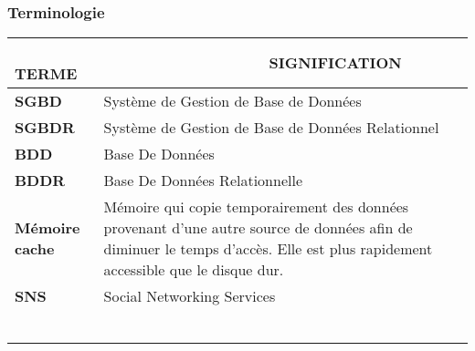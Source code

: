\newpage

\def\termea{\bf \footnotesize SGBD}
\def\sensa{\footnotesize Système de Gestion de Base de Données}

\def\termeb{\bf \footnotesize SGBDR}
\def\sensb{\footnotesize Système de Gestion de Base de Données Relationnel}

\def\terme{\bf \footnotesize BDD}
\def\sens{\footnotesize Base De Données}

\def\termec{\bf \footnotesize BDDR}
\def\sensc{\footnotesize Base De Données Relationnelle}

\def\termed{\bf \footnotesize Mémoire cache}
\def\sensd{\footnotesize Mémoire qui copie temporairement des données provenant d'une autre source de données afin de diminuer le temps d'accès. Elle est plus rapidement accessible que le disque dur.}

\def\termee{\bf \footnotesize SNS}
\def\sense{\footnotesize Social Networking Services}

\def\termef{\bf \footnotesize }
\def\sensf{\footnotesize }

\def\termeg{\bf \footnotesize }
\def\sensg{\footnotesize }

\def\termeh{\bf \footnotesize }
\def\sensh{\footnotesize }

\def\termei{\bf \footnotesize }
\def\sensi{\footnotesize }

\def\termej{\bf \footnotesize }
\def\sensj{\footnotesize }

\def\termek{\bf \footnotesize }
\def\sensk{\footnotesize }

~
\vfill
\begin{center}
\subsubsection*{Terminologie}
\begin{tabular}{p{5cm}p{12cm}}
\hline
{\bf ~~~~~ T{\scriptsize ERME}} & {\bf ~~~~~~~~~~~~~~~~~~~
S{\scriptsize IGNIFICATION}}\\
\hline
\termea &\sensa\\
\termeb &\sensb\\
\terme  &\sens\\
\termec  &\sensc\\
\termed  &\sensd\\
\termee  &\sense\\
\hline
\termef & \sensf\\
\termeg & \sensg\\
\termeh & \sensh\\
\termei & \sensi\\
\termej & \sensj\\
\termek & \sensk\\
\end{tabular}
 
\end{center}
\vfill
